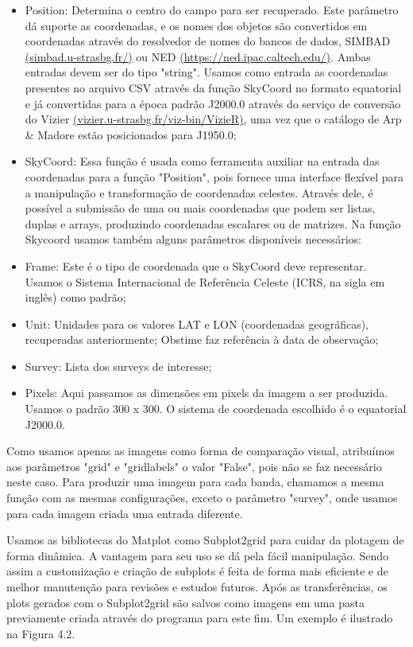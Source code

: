 \begin{itemize}

\item Position: Determina o centro do campo para ser  recuperado. Este parâmetro dá suporte as coordenadas, e os nomes dos objetos são convertidos em coordenadas através do resolvedor de nomes do bancos de dados, SIMBAD \url{(simbad.u-strasbg.fr/)} ou NED \url{(https://ned.ipac.caltech.edu/)}. Ambas entradas devem ser do tipo "string". Usamos como entrada as coordenadas presentes no arquivo CSV através da função SkyCoord no formato equatorial e já convertidas para a época padrão J2000.0 através do serviço de conversão do Vizier \url{ (vizier.u-strasbg.fr/viz-bin/VizieR)}, uma vez que o catálogo de Arp \& Madore estão posicionados para J1950.0;

\item SkyCoord: Essa função é usada como ferramenta auxiliar na entrada das coordenadas para a função "Position", pois fornece uma interface flexível para a manipulação e transformação de coordenadas celestes. Através dele, é possível a submissão de uma ou mais coordenadas que podem ser listas, duplas e arrays, produzindo coordenadas escalares ou de matrizes. Na função Skycoord usamos também alguns parâmetros disponíveis necessários:
\item Frame: Este é o tipo de coordenada que o SkyCoord deve representar. Usamos o Sistema Internacional de Referência Celeste (ICRS, na sigla em inglês) como padrão;
\item Unit: Unidades para os valores LAT e LON (coordenadas geográficas), recuperadas anteriormente; Obstime faz referência à data de observação;
 
\item Survey: Lista dos surveys de interesse;
\item Pixels: Aqui passamos as dimensões em pixels da imagem a ser produzida. Usamos o padrão 300 x 300. O sistema de coordenada escolhido é o equatorial J2000.0.
\end{itemize}

Como usamos apenas as imagens como forma de comparação visual, atribuímos aos parâmetros "grid" e "gridlabels" o valor "False", pois não se faz necessário neste caso. Para produzir uma imagem para cada banda, chamamos a mesma função com as mesmas configurações, exceto o parâmetro "survey", onde usamos para cada imagem criada uma entrada diferente.

Usamos as bibliotecas do Matplot como Subplot2grid para cuidar da plotagem de forma dinâmica. A vantagem para seu uso se dá pela fácil manipulação. Sendo assim a customização e criação de subplots é feita de forma mais eficiente e de melhor manutenção para revisões e estudos futuros. Após as transferências, os plots gerados com o Subplot2grid são salvos como imagens em uma pasta previamente criada através do programa para este fim. Um exemplo é ilustrado na Figura 4.2.

